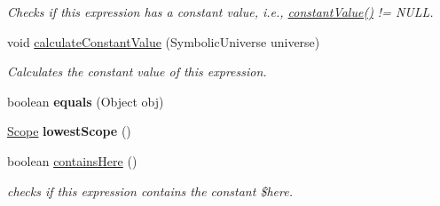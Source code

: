 \begin{DoxyCompactItemize}
\begin{DoxyCompactList}\small\item\em Checks if this expression has a constant value, i.\+e., \hyperlink{classedu_1_1udel_1_1cis_1_1vsl_1_1civl_1_1model_1_1common_1_1expression_1_1CommonExpression_aab292ce8602a2780107dcb6780d7eadf}{constant\+Value()} != N\+U\+L\+L. \end{DoxyCompactList}\item 
void \hyperlink{classedu_1_1udel_1_1cis_1_1vsl_1_1civl_1_1model_1_1common_1_1expression_1_1CommonExpression_a1de2eda56c927876495edec99af3f53a}{calculate\+Constant\+Value} (Symbolic\+Universe universe)
\begin{DoxyCompactList}\small\item\em Calculates the constant value of this expression. \end{DoxyCompactList}\item 
\hypertarget{classedu_1_1udel_1_1cis_1_1vsl_1_1civl_1_1model_1_1common_1_1expression_1_1CommonExpression_ab3ee3ece84690e3c8df695f2ad29849e}{}boolean {\bfseries equals} (Object obj)\label{classedu_1_1udel_1_1cis_1_1vsl_1_1civl_1_1model_1_1common_1_1expression_1_1CommonExpression_ab3ee3ece84690e3c8df695f2ad29849e}

\item 
\hypertarget{classedu_1_1udel_1_1cis_1_1vsl_1_1civl_1_1model_1_1common_1_1expression_1_1CommonExpression_a51bdeceb3eeaab2569a2871bd3205ca9}{}\hyperlink{interfaceedu_1_1udel_1_1cis_1_1vsl_1_1civl_1_1model_1_1IF_1_1Scope}{Scope} {\bfseries lowest\+Scope} ()\label{classedu_1_1udel_1_1cis_1_1vsl_1_1civl_1_1model_1_1common_1_1expression_1_1CommonExpression_a51bdeceb3eeaab2569a2871bd3205ca9}

\item 
boolean \hyperlink{classedu_1_1udel_1_1cis_1_1vsl_1_1civl_1_1model_1_1common_1_1expression_1_1CommonExpression_a9d4713d6f1bf3700af47567f13ac15ff}{contains\+Here} ()
\begin{DoxyCompactList}\small\item\em checks if this expression contains the constant \$here. \end{DoxyCompactList}\end{DoxyCompactItemize}
